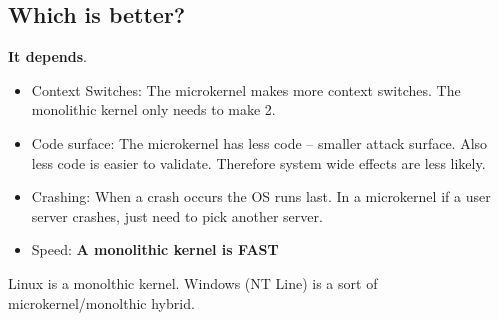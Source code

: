 \documentclass[../base_file/cs1550_notes.tex]{subfiles}
\begin{document}
\subsection{Which is better?}
\textbf{It depends}.
	\begin{itemize}	
	\item Context Switches: The microkernel makes more context switches.  The monolithic kernel only needs
			to make 2.
	\item Code surface: The microkernel has less code -- smaller attack surface.  Also less code is easier
		    to validate.  Therefore system wide effects are less likely.
	\item Crashing: When a crash occurs the OS runs last.  In a microkernel if a user server crashes, just
			need to pick another server.
	\item Speed: \textbf{A monolithic kernel is FAST}	
	\end{itemize}
Linux is a monolthic kernel.  Windows (NT Line) is a sort of microkernel/monolthic hybrid.
\end{document}
